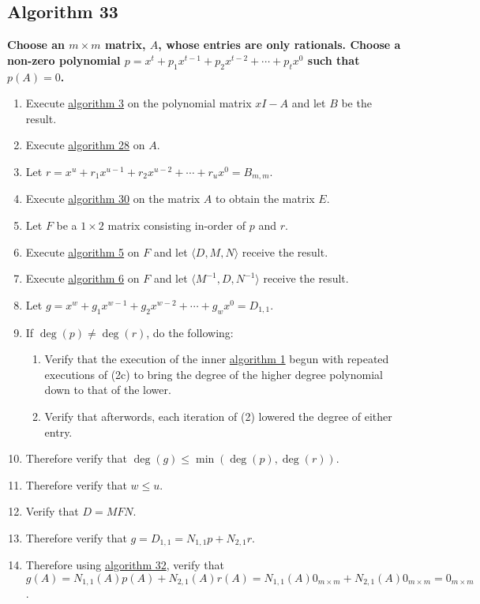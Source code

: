 \documentclass[twocolumn]{article}
\begin{document}
		\subsection{Algorithm 33}\label{sec:algorithm 33}
			\textbf{Choose an $m\times m$ matrix, $A$, whose entries are only rationals. Choose a non-zero polynomial $p=x^t+p_1x^{t-1}+p_2x^{t-2}+\cdots+p_tx^0$ such that $p(A)=0$.}
			\begin{enumerate}
				\item Execute \hyperref[sec:algorithm 3]{algorithm 3} on the polynomial matrix $xI-A$ and let $B$ be the result.
				\item Execute \hyperref[sec:algorithm 28]{algorithm 28} on $A$.
				\item Let $r=x^u+r_1x^{u-1}+r_2x^{u-2}+\cdots+r_ux^0=B_{m,m}$.
				\item Execute \hyperref[sec:algorithm 30]{algorithm 30} on the matrix $A$ to obtain the matrix $E$.
				\item Let $F$ be a $1\times 2$ matrix consisting in-order of $p$ and $r$.
				\item Execute \hyperref[sec:algorithm 5]{algorithm 5} on $F$ and let $\langle D,M,N\rangle$ receive the result.
				\item Execute \hyperref[sec:algorithm 6]{algorithm 6} on $F$ and let $\langle M^{-1},D,N^{-1}\rangle$ receive the result.
				\item Let $g=x^w+g_1x^{w-1}+g_2x^{w-2}+\cdots+g_wx^0=D_{1,1}$.
				\item If $\deg(p)\ne\deg(r)$, do the following:
				\begin{enumerate}
					\item Verify that the execution of the inner \hyperref[sec:algorithm 1]{algorithm 1} begun with repeated executions of (2c) to bring the degree of the higher degree polynomial down to that of the lower.
					\item Verify that afterwords, each iteration of (2) lowered the degree of either entry.
				\end{enumerate}
				\item Therefore verify that $\deg(g)\le\min(\deg(p),\deg(r))$.
				\item Therefore verify that $w\le u$.
				\item Verify that $D=MFN$.
				\item Therefore verify that $g=D_{1,1}=N_{1,1}p+N_{2,1}r$.
				\item Therefore using \hyperref[sec:algorithm 32]{algorithm 32}, verify that $g(A)=N_{1,1}(A)p(A)+N_{2,1}(A)r(A)=N_{1,1}(A)0_{m\times m}+N_{2,1}(A)0_{m\times m}=0_{m\times m}$.

\end{enumerate}
\end{document}
